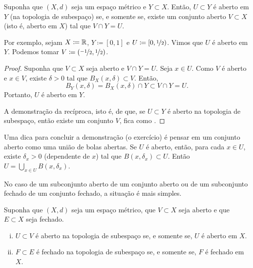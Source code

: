 \begin{prop} \label{prop:topology:subspaceopen}
Suponha que $(X,d)$ seja um espaço métrico e $Y \subset X$. Então,
$U \subset Y$ é aberto em $Y$ (na topologia de subespaço) se, e somente se,
existe um conjunto aberto $V \subset X$ (isto é, aberto em $X$) tal que
$V \cap Y = U$.
\end{prop}

Por exemplo, sejam $X \coloneqq {\mathbb{R}}$, $Y \coloneqq [0,1]$ e
$U \coloneqq [0,\nicefrac{1}{2})$.
Vimos que $U$ é aberto em $Y$.
Podemos tomar $V \coloneqq (\nicefrac{-1}{2},\nicefrac{1}{2})$.

\begin{proof}
Suponha que $V \subset X$ seja aberto e $V \cap Y = U$.
Seja $x \in U$.
Como $V$ é aberto e $x \in V$, existe $\delta > 0$ tal que
$B_X(x,\delta) \subset V$.
Então,
\begin{equation*}
B_Y(x,\delta) = B_X(x,\delta) \cap Y \subset V \cap Y = U .
\end{equation*}
Portanto, $U$ é aberto em $Y$.

A demonstração da recíproca, isto é, de que, se $U \subset Y$ é aberto na
topologia de subespaço, então existe um conjunto $V$, fica como
.
\end{proof}

Uma dica para concluir a demonstração (o exercício) é pensar em um conjunto
aberto como uma união de bolas abertas. Se $U$ é aberto, então, para cada
$x \in U$, existe $\delta_x > 0$ (dependente de $x$) tal que
$B(x,\delta_x) \subset U$. Então $U = \bigcup_{x\in U} B(x,\delta_x)$.

No caso de um subconjunto aberto de um conjunto aberto ou de um subconjunto
fechado de um conjunto fechado, a situação é mais simples.

\begin{prop} \label{prop:topology:subspacesame}
Suponha que $(X,d)$ seja um espaço métrico, que $V \subset X$ seja aberto
e que $E \subset X$ seja fechado.
\begin{enumerate}[(i)]
\item \label{prop:topology:subspacesame:i}
$U \subset V$ é aberto na topologia de subespaço se, e somente se, $U$ é
aberto em $X$.
\item \label{prop:topology:subspacesame:ii}
$F \subset E$ é fechado na topologia de subespaço se, e somente se, $F$ é
fechado em $X$.
\end{enumerate}
\end{prop}

